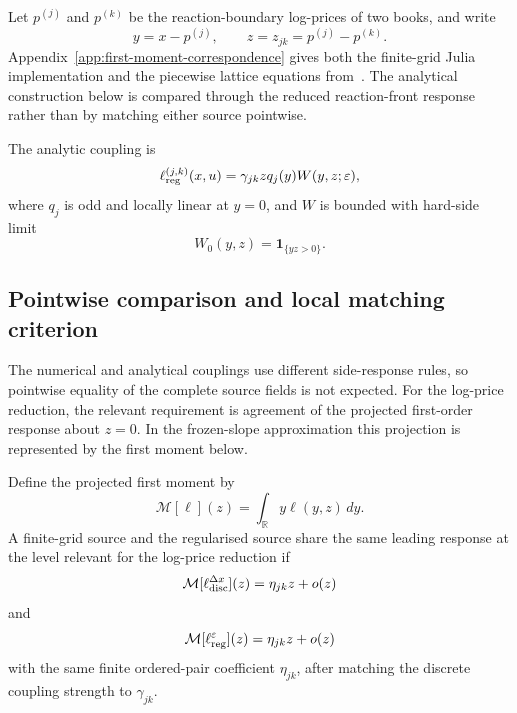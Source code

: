 \documentclass[5p,final]{elsarticle}
\begin{document}
Let $p^{(j)}$ and $p^{(k)}$ be the reaction-boundary log-prices of two books, and write
\begin{equation}
y=x-p^{(j)},
\qquad z=z_{jk}=p^{(j)}-p^{(k)}.
\end{equation}
Appendix~\ref{app:first-moment-correspondence} gives both the finite-grid Julia implementation and the piecewise lattice equations from~\citet{BauerDianaGebbie2024}. The analytical construction below is compared through the reduced reaction-front response rather than by matching either source pointwise.

The analytic coupling is
\begin{equation}
\ell_{\rm reg}^{(j,k)}(x,u)
=\gamma_{jk}zq_j(y)W(y,z;\varepsilon),
\label{eq:eq-reg}
\end{equation}
where $q_j$ is odd and locally linear at $y=0$, and $W$ is bounded with hard-side limit
\begin{equation}
W_0(y,z)=\mathbf 1_{\{yz>0\}}.
\end{equation}

\subsection{Pointwise comparison and local matching criterion}

The numerical and analytical couplings use different side-response rules, so pointwise equality of the complete source fields is not expected. For the log-price reduction, the relevant requirement is agreement of the projected first-order response about $z=0$. In the frozen-slope approximation this projection is represented by the first moment below.

Define the projected first moment by
\begin{equation}
\mathcal M[\ell](z)=\int_{\mathbb R}y\ell(y,z)\,dy.
\end{equation}
A finite-grid source and the regularised source share the same leading response at the level relevant for the log-price reduction if
\begin{equation}
\mathcal M[\ell_{\rm disc}^{\Delta x}](z)
=\eta_{jk} z+o(z)
\end{equation}
and
\begin{equation}
\mathcal M[\ell_{\rm reg}^{\varepsilon}](z)
=\eta_{jk} z+o(z)
\label{eq:weak-equiv}
\end{equation}
with the same finite ordered-pair coefficient $\eta_{jk}$, after matching the discrete coupling strength to $\gamma_{jk}$.
\end{document}
